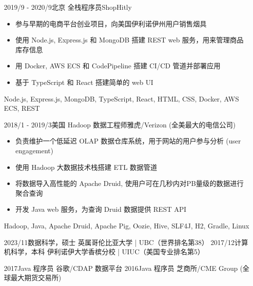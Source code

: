 \documentclass[alternative]{resume_template}
\begin{document}
\begin{experiences}
    \experience
    {2019/9 - 2020/9}{北京}
    {全栈程序员}{ShopHitly}
    {
        \begin{itemize}
            \item 参与早期的电商平台创业项目，向美国伊利诺伊州用户销售烟具
            \item 使用 Node.js, Express.js 和 MongoDB 搭建 REST web 服务，用来管理商品库存信息
            \item 用 Docker, AWS ECS 和 CodePipeline 搭建 CI/CD 管道并部署应用
            \item 基于 TypeScript 和 React 搭建简单的 web UI
        \end{itemize}
    }
    {Node.js, Express.js, MongoDB, TypeScript, React, HTML, CSS, Docker, AWS ECS, REST}

    \experience
    {2018/1 - 2019/3}{美国}
    {Hadoop 数据工程师}{雅虎/Verizon (全美最大的电信公司)}
    {
        \begin{itemize}
            \item 负责维护一个低延迟 OLAP 数据仓库系统，用于网站的用户参与分析 (user engagement)
            \item 使用 Hadoop 大数据技术栈搭建 ETL 数据管道
            \item 将数据导入高性能的 Apache Druid, 使用户可在几秒内对PB量级的数据进行聚合查询
            \item 开发 Java web 服务，为查询 Druid 数据提供 REST API
        \end{itemize}
    }
    {Hadoop, Java, Apache Druid, Apache Pig, Oozie, Hive, SLF4J, H2, Gradle, Linux}

\end{experiences}

\twocolumnsection
{
    \begin{internships}
        \internship
        {2023/11}{数据科学，硕士}
        {英属哥伦比亚大学 | UBC（世界排名第38）}
        \vspace{5pt}
        \internship
        {2017/12}{计算机科学，本科}
        {伊利诺伊大学香槟分校 | UIUC（美国专业排名第5）}
    \end{internships}
}
{
    \begin{internships}
        \internship
        {2017}{Java 程序员}
        {谷歌/CDAP 数据平台}
        \vspace{5pt}
        \internship
        {2016}{Java 程序员}
        {芝商所/CME Group (全球最大期货交易所)}
    \end{internships}
}
\end{document}
